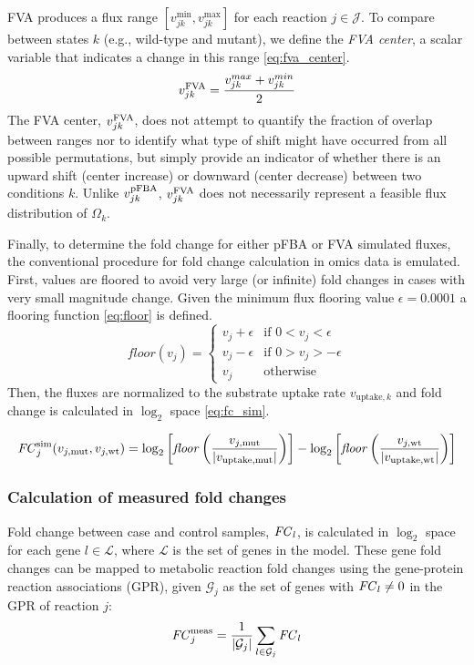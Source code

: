 FVA produces a flux range $[v_{jk}^{\min}, v_{jk}^{\max}]$  for each reaction $j \in \mathcal{J}$. To compare between states $k$ (e.g., wild-type and mutant), we define the \emph{FVA center}, a scalar variable that indicates a change in this range \eqref{eq:fva_center}.
\begin{equation}
    v_{jk}^{\mathrm{FVA}} = \frac{v_{jk}^{max} + v_{jk}^{min}}{2} \label{eq:fva_center}
\end{equation}
The FVA center, $v_{jk}^{\mathrm{FVA}}$, does not attempt to quantify the fraction of overlap between ranges nor to identify what type of shift might have occurred from all possible permutations, but simply provide an indicator of whether there is an upward shift (center increase) or downward (center decrease) between two conditions $k$.
Unlike $v_{jk}^{\mathrm{pFBA}}$, $v_{jk}^{\mathrm{FVA}}$ does not necessarily represent a feasible flux distribution of $\Omega_k$.


Finally, to determine the fold change for either pFBA or FVA simulated fluxes, the conventional procedure for fold change calculation in omics data is emulated. First, values are floored to avoid very large (or infinite) fold changes in cases with very small magnitude change. Given the minimum flux flooring value $\epsilon=0.0001$ a flooring function \eqref{eq:floor} is defined.
\begin{equation} \label{eq:floor}
    \mathit{floor}(v_j) = \begin{cases}
        v_j + \epsilon &\text{if } 0 < v_j < \epsilon \\
        v_j - \epsilon &\text{if } 0 > v_j > -\epsilon \\
        v_j     &\text{otherwise }
    \end{cases}
\end{equation}
Then, the fluxes are normalized to the substrate uptake rate $v_{\text{uptake},k}$ and fold change is calculated in $\log_2$ space \eqref{eq:fc_sim}.

\begin{equation} \label{eq:fc_sim}
    \mathit{FC}_j^{\mathrm{sim}} (v_{j,\text{mut}}, v_{j,\text{wt}}) = \log_2 \left[ \mathit{floor}\left( \frac{v_{j,\text{mut}}}{|v_{\text{uptake,mut}}|} \right) \right] -
    \log_2 \left[ \mathit{floor}\left( \frac{v_{j,\text{wt}}}{|v_{\text{uptake,wt}}|} \right) \right]
\end{equation}

\subsubsection{Calculation of measured fold changes}
Fold change between case and control samples, $\mathit{FC}_l$, is calculated in $\log_2$ space for each gene $l\in \mathcal{L}$, where $\mathcal{L}$ is the set of genes in the model. These gene fold changes can be mapped to metabolic reaction fold changes using the gene-protein reaction associations (GPR), given $\mathcal{G}_j$ as the set of genes with $\mathit{FC}_l \ne 0$ in the GPR of reaction $j$:
\begin{equation}
    \mathit{FC}_j^{\mathrm{meas}} = \frac{1}{|\mathcal{G}_j|}\sum_{l \in \mathcal{G}_j} \mathit{FC}_l \label{eq:fc_meas}
\end{equation}

